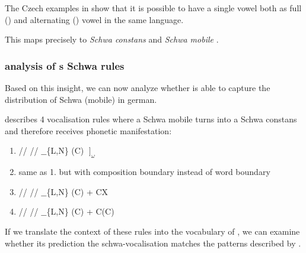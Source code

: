 The Czech examples in  show that it is possible
to have a single vowel both as full () and alternating ()
vowel in the same language.

This maps precisely to \emph{Schwa constans} and \emph{Schwa mobile}
\cite{issatschenko1974}.

\subsubsection{\CVCV analysis of \citeauthor{issatschenko1974}s Schwa rules}
Based on this insight, we can now analyze whether \CVCV is able to capture
the distribution of Schwa (mobile) in german.



\citeauthor{issatschenko1974} describes 4 vocalisation rules where
a Schwa mobile turns into a Schwa constans and therefore receives
phonetic manifestation:

\begin{enumerate}
  \item \deriv
    {/\schwaMobi/}    %
    {/\schwaCons/}    %
    {$\_\_$\{L,N\} (C) $\;\big]_\omega$}
  \item same as 1. but with composition boundary instead of word boundary
  \item \deriv
    {/\schwaMobi/}    %
    {/\schwaCons/}    %
    {$\_\_$\{L,N\} (C) + CX}
  \item \deriv
    {/\schwaMobi/}    %
    {/\schwaCons/}    %
    {$\_\_$\{L,N\} (C) + \schwaMobi C(C)}
\end{enumerate}

If we translate the context of these rules into the
vocabulary of \CVCV, we can examine whether its prediction
 the schwa-vocalisation matches the patterns
described by \citeauthor{issatschenko1974}.

